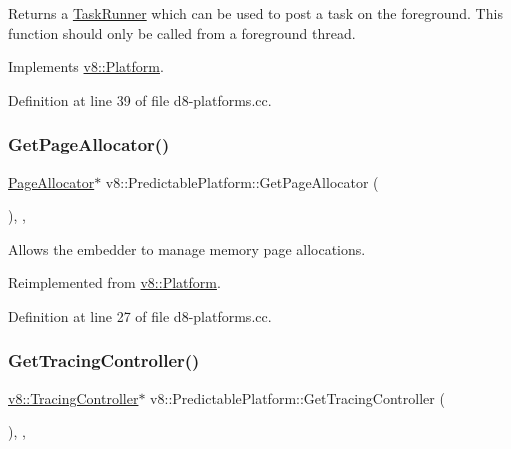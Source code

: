 Returns a \mbox{\hyperlink{classv8_1_1TaskRunner}{Task\+Runner}} which can be used to post a task on the foreground. This function should only be called from a foreground thread. 

Implements \mbox{\hyperlink{classv8_1_1Platform_af0d18c6bbefa133c5d11ec8a460d0278}{v8\+::\+Platform}}.



Definition at line 39 of file d8-\/platforms.\+cc.

\mbox{\label{classv8_1_1PredictablePlatform_ac9e493b7320d723958f47c93dfd1db70}} 
\subsubsection{\texorpdfstring{Get\+Page\+Allocator()}{GetPageAllocator()}}
{\footnotesize\ttfamily \mbox{\hyperlink{classv8_1_1PageAllocator}{Page\+Allocator}}$\ast$ v8\+::\+Predictable\+Platform\+::\+Get\+Page\+Allocator (\begin{DoxyParamCaption}{ }\end{DoxyParamCaption})\hspace{0.3cm}{\ttfamily [inline]}, {\ttfamily [override]}, {\ttfamily [virtual]}}

Allows the embedder to manage memory page allocations. 

Reimplemented from \mbox{\hyperlink{classv8_1_1Platform_ab7c1886dd8131f7389b805bc98276702}{v8\+::\+Platform}}.



Definition at line 27 of file d8-\/platforms.\+cc.

\mbox{\label{classv8_1_1PredictablePlatform_acea822c93bd1f6a51439d21a59aa5d48}} 
\subsubsection{\texorpdfstring{Get\+Tracing\+Controller()}{GetTracingController()}}
{\footnotesize\ttfamily \mbox{\hyperlink{classv8_1_1TracingController}{v8\+::\+Tracing\+Controller}}$\ast$ v8\+::\+Predictable\+Platform\+::\+Get\+Tracing\+Controller (\begin{DoxyParamCaption}{ }\end{DoxyParamCaption})\hspace{0.3cm}{\ttfamily [inline]}, {\ttfamily [override]}, {\ttfamily [virtual]}}

